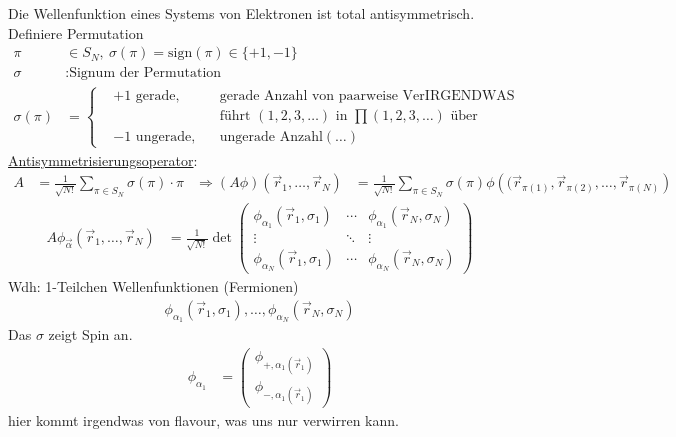 		Die Wellenfunktion eines Systems von Elektronen ist total antisymmetrisch. \\
		Definiere Permutation
			\begin{align*}
				\pi &\in S_N ,~ \sigma (\pi) = \mathrm{sign}(\pi) \in \{+1, -1\} \\	
				\sigma &: \text{Signum der Permutation}\\
				\sigma (\pi) &=
				\left\{
					\begin{aligned}
						&+1 \text{ gerade} ,& &\text{gerade Anzahl von paarweise VerIRGENDWAS} \\
						& & &\text{führt } (1,2,3, \ldots) \text{ in } \prod (1,2,3,\ldots) \text{ über}\\
						&-1 \text{ ungerade} ,& &\text{ungerade Anzahl} (\ldots)
					\end{aligned}
				\right.
			\end{align*}
		\underline{Antisymmetrisierungsoperator}:
			\begin{align*}
				A &= \frac{1}{\sqrt{N!}} \sum_{\pi \in S_N} \sigma (\pi) \cdot \pi 
				&\Rightarrow (A \phi) (\vec{r}_1, \ldots, \vec{r}_N) 
				&= \frac{1}{\sqrt{N!}} \sum_{\pi \in S_N} \sigma(\pi)
				\phi \left((\vec{r}_{\pi(1)}, \vec{r}_{\pi(2)}, \ldots ,\vec{r}_{\pi(N)}\right)   
			\end{align*}
			\begin{align*}
				A \phi_{\vec{\alpha}} (\vec{r}_1, \ldots, \vec{r}_N)
				&= \frac{1}{\sqrt{N!}} 
				\det
				\begin{pmatrix}
					\phi_{\alpha_1}(\vec{r}_1, \sigma_1) & \cdots & \phi_{\alpha_1}(\vec{r}_N, \sigma_N) \\
					\vdots & \ddots & \vdots\\
					\phi_{\alpha_N}(\vec{r}_1, \sigma_1) & \cdots & \phi_{\alpha_N}(\vec{r}_N, \sigma_N)
				\end{pmatrix}
			\end{align*}
	Wdh: 1-Teilchen Wellenfunktionen (Fermionen)
		\begin{align*}
			\phi_{\alpha_1}(\vec{r}_1, \sigma_1), \ldots, \phi_{\alpha_N}(\vec{r}_N, \sigma_N)
		\end{align*}
	Das $\sigma$ zeigt Spin an.
		\begin{align*}
			\phi_{\alpha_1} &= 
			\begin{pmatrix}
				\phi_{+, \alpha_1 (\vec{r}_1)} \\
				\phi_{-, \alpha_1 (\vec{r}_1)}
			\end{pmatrix}
		\end{align*}
	hier kommt irgendwas von flavour, was uns nur verwirren kann.
	
